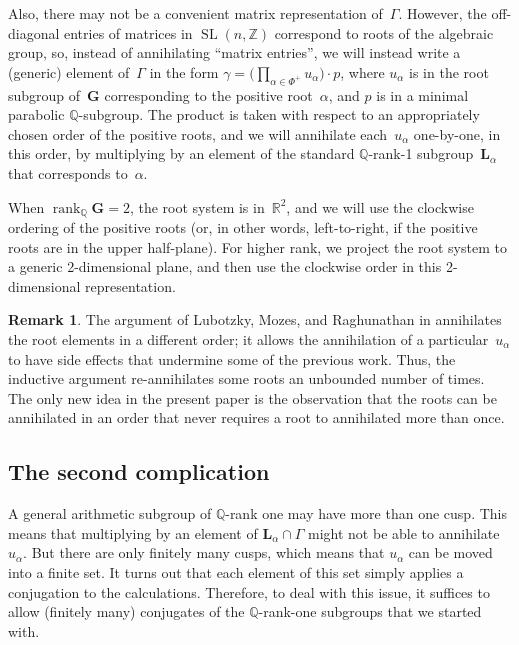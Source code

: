 \documentclass[pdftex]{sigma}
\newcommand{\QQ}{\mathbb{Q}}
\newcommand{\RR}{\mathbb{R}}
\newcommand{\ZZ}{\mathbb{Z}}
\newcommand{\Ga}{\mathbf{G}}
\newcommand{\La}{\mathbf{L}}
\DeclareMathOperator{\rank}{rank}
\DeclareMathOperator{\SL}{SL}
\numberwithin{equation}{section}
\theoremstyle{definition}
\newtheorem{rem}[thm]{Remark}
\begin{document}
Also, there may not be a convenient matrix representation of~$\Gamma$. However, the off-diagonal entries of matrices in $\SL(n,\ZZ)$ correspond to roots of the algebraic group, so, instead of annihi\-la\-ting ``matrix entries'', we will instead write a (generic) element of~$\Gamma$ in the form $\gamma = \bigl(\prod\limits_{\alpha\in \Phi^+} u_\alpha \bigr) \cdot p$, where $u_\alpha$ is in the root subgroup of~$\Ga$ corresponding to the positive root~$\alpha$, and $p$ is in a minimal parabolic $\QQ$-subgroup.
The product is taken with respect to an appropriately chosen order of the positive roots, and we will annihilate each~$u_\alpha$ one-by-one, in this order, by multiplying by an element of the standard $\QQ$-rank-1 subgroup~$\La_\alpha$ that corresponds to~$\alpha$.

When $\rank_\QQ \Ga = 2$, the root system is in~$\RR^2$, and we will use the clockwise ordering of the positive roots (or, in other words, left-to-right, if the positive roots are in the upper half-plane). For higher rank, we project the root system to a generic 2-dimensional plane, and then use the clockwise order in this 2-dimensional representation.

\begin{rem} The argument of Lubotzky, Mozes, and Raghunathan in \cite[Section~4]{MR1828742} annihilates the root elements in a different order; it allows the annihilation of a particular~$u_\alpha$ to have side effects that undermine some of the previous work. Thus, the inductive argument re-annihilates some roots an unbounded number of times. The only new idea in the present paper is the observation that the roots can be annihilated in an order that never requires a root to annihilated more than once.
\end{rem}

\subsection*{The second complication}
 A general arithmetic subgroup of $\QQ$-rank one may have more than one cusp. This means that multiplying by an element of $\La_\alpha \cap \Gamma$ might not be able to annihilate $u_\alpha$. But there are only finitely many cusps, which means that $u_\alpha$ can be moved into a finite set. It turns out that each element of this set simply applies a conjugation to the calculations. Therefore, to deal with this issue, it suffices to allow (finitely many) conjugates of the $\QQ$-rank-one subgroups that we started with.
\end{document}
